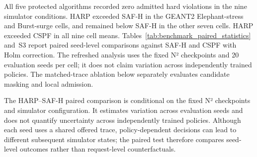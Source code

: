 \documentclass[final,5p]{elsarticle}
\newcommand{\rev}[1]{\textcolor{revisiongreen}{#1}}
\let\newrev\rev
\begin{document}
\newrev{All five protected algorithms recorded zero admitted hard violations in the nine simulator conditions. HARP exceeded SAF-H in the GEANT2 Elephant-stress and Burst-surge cells, and remained below SAF-H in the other seven cells. HARP exceeded CSPF in all nine cell means. Tables~\ref{tab:benchmark_paired_statistics} and~S3 report paired seed-level comparisons against SAF-H and CSPF with Holm correction. The refreshed analysis uses the fixed N² checkpoints and 20 evaluation seeds per cell; it does not claim variation across independently trained policies. The matched-trace ablation below separately evaluates candidate masking and local admission.}

\begin{table}[t]
\color{revisiongreen}
\centering
\caption{\newrev{HARP--SAF-H acceptance differences ($\Delta$, percentage points; 20 paired seeds). Intervals: bootstrap 95\% CI; $p_H$: Wilcoxon $p$ with Holm correction across nine conditions; $r$: rank-biserial effect. Profiles E/B/C follow Table~\ref{tab:simulation_acceptance_summary}.}}
\label{tab:benchmark_paired_statistics}
\scriptsize
\setlength{\tabcolsep}{3pt}
\end{table}

\newrev{The HARP--SAF-H paired comparison is conditional on the fixed N² checkpoints and simulator configuration. It estimates variation across evaluation seeds and does not quantify uncertainty across independently trained policies. Although each seed uses a shared offered trace, policy-dependent decisions can lead to different subsequent simulator states; the paired test therefore compares seed-level outcomes rather than request-level counterfactuals.}
\end{document}

